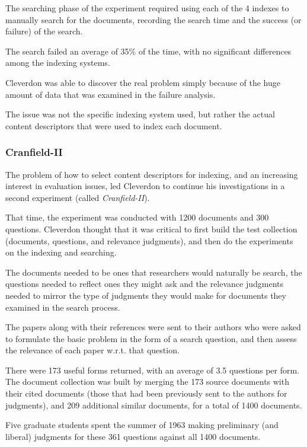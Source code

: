 The searching phase of the experiment required using each of the 4 indexes to manually search for the documents, recording the search time and the success (or failure) of the search.

The search failed an average of 35\% of the time, with no significant differences among the indexing systems.

Cleverdon was able to discover the real problem simply because of the huge amount of data that was examined in the failure analysis.

The issue was not the specific indexing system used, but rather the actual content descriptors that were used to index each document.

\subsubsection{Cranfield-II}

The problem of how to select content descriptors for indexing, and an increasing interest in evaluation issues, led Cleverdon to continue his investigations in a second experiment (called \textit{Cranfield-II}).

That time, the experiment was conducted with 1200 documents and 300 questions. Cleverdon thought that it was critical to first build the test collection (documents, questions, and relevance judgments), and then do the experiments on the indexing and searching.

The documents needed to be ones that researchers would naturally be search, the questions needed to reflect ones they might ask and the relevance judgments needed to mirror the type of judgments they would make for documents they examined in the search process.

The papers along with their references were sent to their authors who were asked to formulate the basic problem in the form of a search question, and then assess the relevance of each paper w.r.t. that question.

There were 173 useful forms returned, with an average of 3.5 questions per form. The document collection was built by merging the 173 source documents with their cited documents (those that had been previously sent to the authors for judgments), and 209 additional similar documents, for a total of 1400 documents.

Five graduate students spent the summer of 1963 making preliminary (and liberal) judgments for these 361 questions against all 1400 documents.

